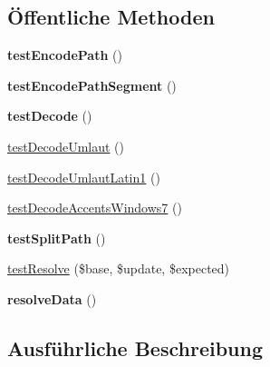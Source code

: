 \subsection*{Öffentliche Methoden}
\begin{DoxyCompactItemize}
\item 
\mbox{\label{class_sabre_1_1_h_t_t_p_1_1_u_r_l_util_test_a17ee003dc12835349e462738d586067b}} 
{\bfseries test\+Encode\+Path} ()
\item 
\mbox{\label{class_sabre_1_1_h_t_t_p_1_1_u_r_l_util_test_a8c6ac7b326798e588699a19ea4cb1e60}} 
{\bfseries test\+Encode\+Path\+Segment} ()
\item 
\mbox{\label{class_sabre_1_1_h_t_t_p_1_1_u_r_l_util_test_aa90d75e24fa16ebfdb80341f70182a45}} 
{\bfseries test\+Decode} ()
\item 
\mbox{\hyperlink{class_sabre_1_1_h_t_t_p_1_1_u_r_l_util_test_a721f877c0d4f08bf5bbf997b3b7ae528}{test\+Decode\+Umlaut}} ()
\item 
\mbox{\hyperlink{class_sabre_1_1_h_t_t_p_1_1_u_r_l_util_test_afc4c56b1444f9e8e05355ad5ffc54f1d}{test\+Decode\+Umlaut\+Latin1}} ()
\item 
\mbox{\hyperlink{class_sabre_1_1_h_t_t_p_1_1_u_r_l_util_test_a3dc4f74910a4ade18ceca11b6af75356}{test\+Decode\+Accents\+Windows7}} ()
\item 
\mbox{\label{class_sabre_1_1_h_t_t_p_1_1_u_r_l_util_test_acee598a3949bc3fdc781838dff6a800e}} 
{\bfseries test\+Split\+Path} ()
\item 
\mbox{\hyperlink{class_sabre_1_1_h_t_t_p_1_1_u_r_l_util_test_a72f219ca80c37a22908e6f0b7205cbd4}{test\+Resolve}} (\$base, \$update, \$expected)
\item 
\mbox{\label{class_sabre_1_1_h_t_t_p_1_1_u_r_l_util_test_af4cfc5180161143889021f4ee7f80b39}} 
{\bfseries resolve\+Data} ()
\end{DoxyCompactItemize}


\subsection{Ausführliche Beschreibung}


